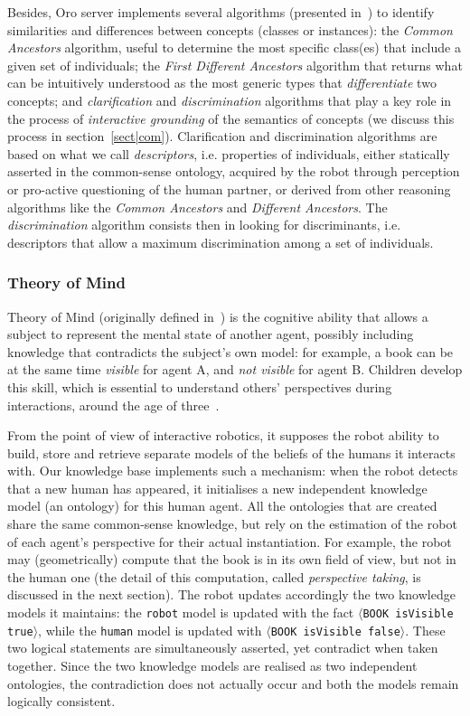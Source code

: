 \documentclass[preprint,3p,times]{elsarticle}
\newcommand{\concept}[1]{{\small \texttt{#1}}}
\newcommand{\stmt}[1]{{\footnotesize\tt$\langle$#1\relax$\rangle$}}
\newcommand{\ie}{i.e.\xspace}
\begin{document}
Besides, {\sc Oro} server implements several algorithms (presented
in~\cite{Ros2010b}) to identify
similarities and differences between concepts (classes or
instances): the \emph{Common Ancestors} algorithm, useful to
determine the most specific class(es) that include a given set of individuals;
the \emph{First Different Ancestors} algorithm that returns what can be
intuitively understood as the most generic types that \emph{differentiate} two
concepts; and \emph{clarification} and \emph{discrimination} algorithms that
play a key role in the process of \emph{interactive grounding} of the semantics
of concepts (we discuss this process in section~\ref{sect|com}). Clarification
and discrimination algorithms are based on what we call \emph{descriptors}, \ie
properties of individuals, either statically asserted in the common-sense
ontology, acquired by the robot through perception or pro-active questioning of
the human partner, or derived from other reasoning algorithms like the
\emph{Common Ancestors} and \emph{Different Ancestors}. The
\emph{discrimination} algorithm consists then in looking for discriminants, \ie
descriptors that allow a maximum discrimination among a set of individuals.

\subsubsection{Theory of Mind}
\label{sect|tom}

Theory of Mind (originally defined in~\cite{Premack1978}) is the cognitive
ability that allows a subject to represent the mental state of another
agent, possibly including knowledge that contradicts the subject's own model: for
example, a book can be at the same time \emph{visible} for agent A, and \emph{not
visible} for agent B. Children develop this skill, which is essential to understand others' perspectives during
interactions, around the age of three~\cite{perner2012infants}. 

From the point of view of interactive robotics, it supposes the robot ability to
build, store and retrieve separate models of the beliefs of the humans it
interacts with.  Our knowledge base implements such a mechanism: when the robot
detects that a new human has appeared, it initialises a new independent
knowledge model (an ontology) for this human agent. All the ontologies that are
created share the same common-sense knowledge, but rely on the estimation of the
robot of each agent's perspective for their actual instantiation. For example,
the robot may (geometrically) compute that the book is in its own field of view,
but not in the human one (the detail of this computation, called
\emph{perspective taking}, is discussed in the next section). The robot updates
accordingly the two knowledge models it maintains: the \concept{robot} model is
updated with the fact \stmt{BOOK isVisible true}, while the \concept{human}
model is updated with \stmt{BOOK isVisible false}. These two logical statements
are simultaneously asserted, yet contradict when taken together. Since the two
knowledge models are realised as two independent ontologies, the contradiction
does not actually occur and both the models remain logically consistent.
\end{document}
